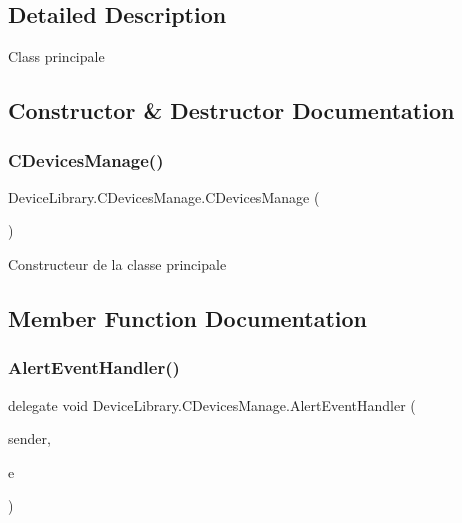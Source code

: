 \subsection{Detailed Description}
Class principale 



\subsection{Constructor \& Destructor Documentation}
\mbox{\label{class_device_library_1_1_c_devices_manage_a56177d99576c5d63e3233458a2a70ae1}} 
\subsubsection{\texorpdfstring{C\+Devices\+Manage()}{CDevicesManage()}}
{\footnotesize\ttfamily Device\+Library.\+C\+Devices\+Manage.\+C\+Devices\+Manage (\begin{DoxyParamCaption}{ }\end{DoxyParamCaption})\hspace{0.3cm}{\ttfamily [inline]}}



Constructeur de la classe principale 



\subsection{Member Function Documentation}
\mbox{\label{class_device_library_1_1_c_devices_manage_a76f84b8a18500338f67d33123aa3332a}} 
\subsubsection{\texorpdfstring{Alert\+Event\+Handler()}{AlertEventHandler()}}
{\footnotesize\ttfamily delegate void Device\+Library.\+C\+Devices\+Manage.\+Alert\+Event\+Handler (\begin{DoxyParamCaption}\item[{object}]{sender,  }\item[{\mbox{\hyperlink{class_device_library_1_1_calert_event_args}{Calert\+Event\+Args}}}]{e }\end{DoxyParamCaption})}







